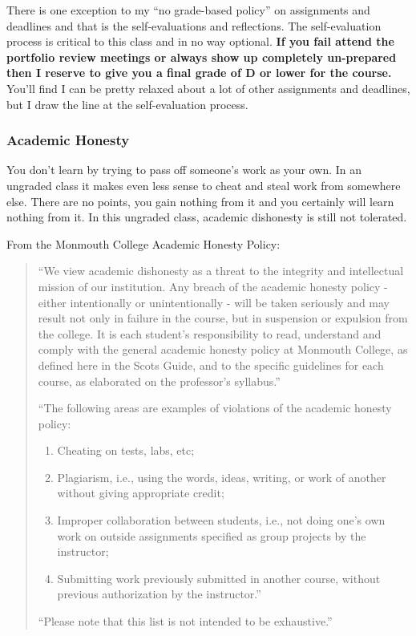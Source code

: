 \documentclass[10pt]{article}
\begin{document}
There is one exception to my ``no grade-based policy'' on assignments and deadlines and that is the
self-evaluations and reflections. The self-evaluation process is critical to this class and in no way
optional. \textbf{If you fail attend the portfolio review meetings or always show up completely un-prepared
then I reserve to give you a final grade of D or lower for the course.} You'll find I can be pretty relaxed
about a lot of other assignments and deadlines, but I draw the line at the self-evaluation process.

\subsubsection*{Academic Honesty}

You don't learn by trying to pass off someone's work as your own. In an ungraded class it makes even less sense to cheat and steal work from somewhere else.  There are no points, you gain nothing from it and you certainly will learn nothing from it. In this ungraded class, academic dishonesty is still not tolerated.

From the Monmouth College Academic Honesty Policy:
\begin{quote}
  ``We view academic dishonesty as a threat to the integrity and intellectual mission of our institution. Any breach of the academic honesty policy - either intentionally or unintentionally - will be taken seriously and may result not only in failure in the course, but in suspension or expulsion from the college. It is each student’s responsibility to read, understand and comply with the general academic honesty policy at Monmouth College, as defined here in the Scots Guide, and to the specific guidelines for each course, as elaborated on the professor’s syllabus.''

  ``The following areas are examples of violations of the academic honesty policy:
  \begin{enumerate}
  \item Cheating on tests, labs, etc;
  \item Plagiarism, i.e., using the words, ideas, writing, or work of another without giving appropriate credit;
  \item Improper collaboration between students, i.e., not doing one’s own work on outside assignments specified as group projects by the instructor;
  \item Submitting work previously submitted in another course, without previous authorization by the instructor.''
  \end{enumerate}

  ``Please note that this list is not intended to be exhaustive.''
\end{quote}
\end{document}
